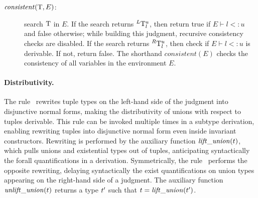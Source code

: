 \begin{description}
\item[\normalfont\(\mathit{consistent}(\mathrm{T},E)\):] search \(\mathrm{T}\) in
  \(E\).  If the search returns \(^L \mathrm{T}_l^u\), then return
  true if \(E \vdash l <: u\) and false otherwise; while building this judgment,
  recursive consistency checks are disabled.
  If the search returns \(^R \mathrm{T}_l^u\),
  then check if \(E \vdash l <: u\) is derivable.  If not, return
  false. %
  The shorthand \(\mathit{consistent}(E)\) checks the consistency of all
  variables in the environment \(E\).
\end{description}

\paragraph{Distributivity.}
The rule~
rewrites tuple types on the left-hand side of the judgment into
disjunctive normal forms, making the distributivity of unions
with respect to tuples derivable.  This rule can be invoked multiple
times in a subtype derivation, enabling rewriting tuples
into disjunctive normal form even inside invariant
constructors.
Rewriting is performed by the auxiliary function
\(\mathit{lift\_union}(t)\), which pulls unions and existential types out of
tuples, anticipating
syntactically the forall quantifications in a derivation.
Symmetrically, the rule~ performs
the opposite rewriting, delaying syntactically the exist
quantifications on union types appearing on the right-hand side of
a judgment.  The auxiliary function \(\mathit{unlift\_union}(t)\) returns
a type \(t'\) such that \(t = \mathit{lift\_union}(t')\). 

